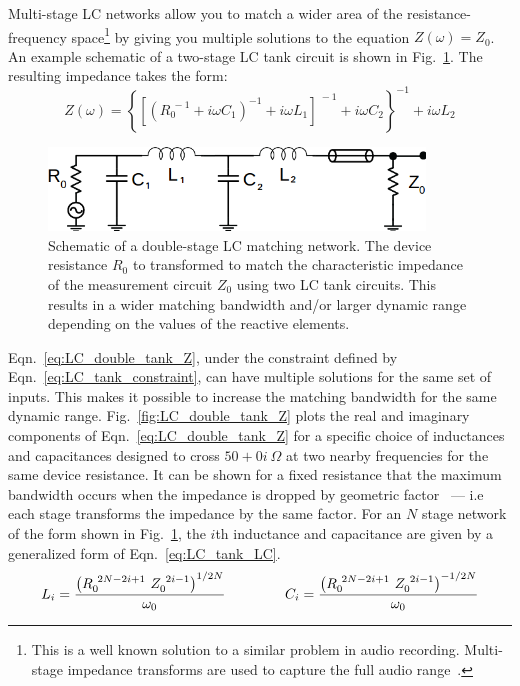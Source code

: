 Multi-stage LC networks allow you to match a wider area of the resistance-frequency space\footnote{This is a well known solution to a similar problem in audio recording. Multi-stage impedance transforms are used to capture the full audio range~\cite{horowitz_art_1989}.} by giving you multiple solutions to the equation $Z(\omega)=Z_0$. An example schematic of a two-stage LC tank circuit is shown in Fig.~\ref{fig:schematic_double_matching}. The resulting impedance takes the form:
\begin{equation}\label{eq:LC_double_tank_Z}
Z(\omega) = \left\lbrace\left[\left(R_0^{~-1}+i\omega C_1\right)^{-1}+i\omega L_1\right]^{~-1}+i\omega C_2\right\rbrace^{-1}+i\omega L_2
\end{equation}
\begin{figure}
\centering
\includegraphics[width=100mm]{figures/Johnson_noise_thermometry/schematic_double_matching}
\caption{Schematic of a double-stage LC matching network. The device resistance $R_0$ to transformed to match the characteristic impedance of the measurement circuit $Z_0$ using two LC tank circuits. This results in a wider matching bandwidth and/or larger dynamic range depending on the values of the reactive elements.}
\label{fig:schematic_double_matching}
\end{figure}
Eqn.~\ref{eq:LC_double_tank_Z}, under the constraint defined by Eqn.~\ref{eq:LC_tank_constraint}, can have multiple solutions for the same set of inputs. This makes it possible to increase the matching bandwidth for the same dynamic range. Fig.~\ref{fig:LC_double_tank_Z} plots the real and imaginary components of Eqn.~\ref{eq:LC_double_tank_Z} for a specific choice of inductances and capacitances designed to cross $50+0i~\Omega$ at two nearby frequencies for the same device resistance. It can be shown for a fixed resistance that the maximum bandwidth occurs when the impedance is dropped by geometric factor~\cite{pozar_microwave_2011} --- i.e each stage transforms the impedance by the same factor. For an $N$ stage network of the form shown in Fig.~\ref{fig:schematic_double_matching}, the $i$th inductance and capacitance are given by a generalized form of Eqn.~\ref{eq:LC_tank_LC}. 
\begin{equation}\label{eq:LC_double_tank_LC}
L_i = \frac{\left(R_0^{~2N-2i+1}~Z_0^{~2i-1}\right)^{1/2N}}{\omega_0}
\hspace{15mm}
C_i = \frac{\left(R_0^{~2N-2i+1}~Z_0^{~2i-1}\right)^{-1/2N}}{\omega_0}
\end{equation}
